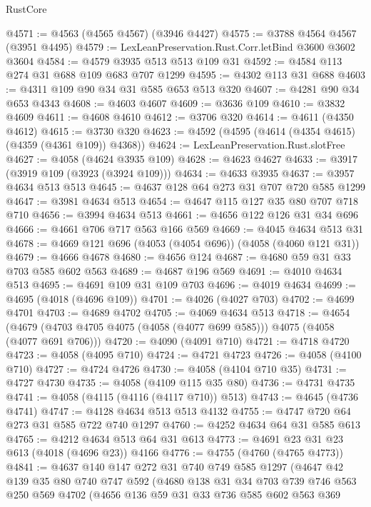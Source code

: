 \begin{lexlean}{RustCore}
\begin{coremodule}
@4571 := @4563 (@4565 @4567) (@3946 @4427)
@4575 := @3788 @4564 @4567 (@3951 @4495)
@4579 := LexLeanPreservation.Rust.Corr.letBind @3600 @3602 @3604
@4584 := @4579 @3935 @513 @513 @109 @31
@4592 := @4584 @113 @274 @31 @688 @109 @683 @707 @1299
@4595 := @4302 @113 @31 @688
@4603 := @4311 @109 @90 @34 @31 @585 @653 @513 @320
@4607 := @4281 @90 @34 @653 @4343
@4608 := @4603 @4607
@4609 := @3636 @109
@4610 := @3832 @4609
@4611 := @4608 @4610
@4612 := @3706 @320
@4614 := @4611 (@4350 @4612)
@4615 := @3730 @320
@4623 := @4592 (@4595 (@4614 (@4354 @4615) (@4359 (@4361 @109)) @4368))
@4624 := LexLeanPreservation.Rust.slotFree
@4627 := @4058 (@4624 @3935 @109)
@4628 := @4623 @4627
@4633 := @3917 (@3919 @109 (@3923 (@3924 @109)))
@4634 := @4633 @3935
@4637 := @3957 @4634 @513 @513
@4645 := @4637 @128 @64 @273 @31 @707 @720 @585 @1299
@4647 := @3981 @4634 @513
@4654 := @4647 @115 @127 @35 @80 @707 @718 @710
@4656 := @3994 @4634 @513
@4661 := @4656 @122 @126 @31 @34 @696
@4666 := @4661 @706 @717 @563 @166 @569
@4669 := @4045 @4634 @513 @31
@4678 := @4669 @121 @696 (@4053 (@4054 @696)) (@4058 (@4060 @121 @31))
@4679 := @4666 @4678
@4680 := @4656 @124
@4687 := @4680 @59 @31 @33 @703 @585 @602 @563
@4689 := @4687 @196 @569
@4691 := @4010 @4634 @513
@4695 := @4691 @109 @31 @109 @703
@4696 := @4019 @4634
@4699 := @4695 (@4018 (@4696 @109))
@4701 := @4026 (@4027 @703)
@4702 := @4699 @4701
@4703 := @4689 @4702
@4705 := @4069 @4634 @513
@4718 := @4654 (@4679 (@4703 @4705 @4075 (@4058 (@4077 @699 @585))) @4075 (@4058 (@4077 @691 @706)))
@4720 := @4090 (@4091 @710)
@4721 := @4718 @4720
@4723 := @4058 (@4095 @710)
@4724 := @4721 @4723
@4726 := @4058 (@4100 @710)
@4727 := @4724 @4726
@4730 := @4058 (@4104 @710 @35)
@4731 := @4727 @4730
@4735 := @4058 (@4109 @115 @35 @80)
@4736 := @4731 @4735
@4741 := @4058 (@4115 (@4116 (@4117 @710)) @513)
@4743 := @4645 (@4736 @4741)
@4747 := @4128 @4634 @513 @513 @4132
@4755 := @4747 @720 @64 @273 @31 @585 @722 @740 @1297
@4760 := @4252 @4634 @64 @31 @585 @613
@4765 := @4212 @4634 @513 @64 @31 @613
@4773 := @4691 @23 @31 @23 @613 (@4018 (@4696 @23)) @4166
@4776 := @4755 (@4760 (@4765 @4773))
@4841 := @4637
    @140
    @147
    @272
    @31
    @740
    @749
    @585
    @1297
    (@4647
      @42
      @139
      @35
      @80
      @740
      @747
      @592
      (@4680
        @138
        @31
        @34
        @703
        @739
        @746
        @563
        @250
        @569
        @4702
        (@4656
          @136
          @59
          @31
          @33
          @736
          @585
          @602
          @563
          @369

\end{coremodule}
\end{lexlean}
